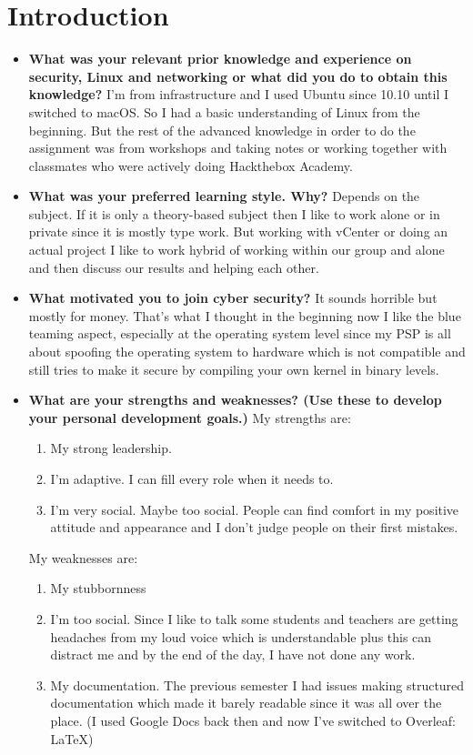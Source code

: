 \documentclass[12pt, letterpaper]{article}
\begin{document}
\section{Introduction}
\begin{itemize}
\item \textbf{What was your relevant prior knowledge and experience on security, Linux and networking or what did you do to obtain this knowledge?}
\hfill\break
\hfill\break
I'm from infrastructure and I used Ubuntu since 10.10 until I switched to macOS. So I had a basic understanding of Linux from the beginning. But the rest of the advanced knowledge in order to do the assignment was from workshops and taking notes or working together with classmates who were actively doing Hackthebox Academy.

\item \textbf{What was your preferred learning style. Why?}
\hfill\break
\hfill\break
Depends on the subject. If it is only a theory-based subject then I like to work alone or in private since it is mostly type work. But working with vCenter or doing an actual project I like to work hybrid of working within our group and alone and then discuss our results and helping each other.

\item \textbf{What motivated you to join cyber security?}
\hfill\break
\hfill\break
It sounds horrible but mostly for money. That's what I thought in the beginning now I like the blue teaming aspect, especially at the operating system level since my PSP is all about spoofing the operating system to hardware which is not compatible and still tries to make it secure by compiling your own kernel in binary levels.

\item \textbf{What are your strengths and weaknesses? (Use these to develop your personal development goals.)}
\hfill\break
\hfill\break
My strengths are:
\begin{enumerate}
    \item My strong leadership. 
    \item I'm adaptive. I can fill every role when it needs to.
    \item I'm very social. Maybe too social. People can find comfort in my positive attitude and appearance and I don't judge people on their first mistakes.
\end{enumerate}

My weaknesses are:
\begin{enumerate}
    \item My stubbornness
    \item I'm too social. Since I like to talk some students and teachers are getting headaches from my loud voice which is understandable plus this can distract me and by the end of the day, I have not done any work.
\hfill\break
\hfill\break
    \item My documentation. The previous semester I had issues making structured documentation which made it barely readable since it was all over the place. (I used Google Docs back then and now I've switched to Overleaf: LaTeX) 
\end{enumerate}
\end{itemize}
\end{document}
